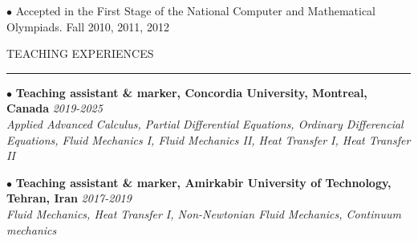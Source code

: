 \documentclass[11pt]{article}
\begin{document}
		{\noindent $\bullet$ Accepted in the First Stage of the National Computer and Mathematical Olympiads.} \hfill {Fall 2010, 2011, 2012} 
		\vspace{1.5mm}
		
		\newpage
		
		\noindent TEACHING EXPERIENCES
		
		\vspace{-2mm}
		
		\noindent\rule[0.5ex]{\linewidth}{1pt}
		
		{\noindent $\bullet$ \bf Teaching assistant \& marker, Concordia University, Montreal, Canada} \hfill {\em 2019-2025} 
		\\ \textit{Applied Advanced Calculus, Partial Differential Equations, Ordinary Differencial Equations, Fluid Mechanics I, Fluid Mechanics II, Heat Transfer I, Heat Transfer II}
		
		\vspace{1.5mm}
		
		{\noindent $\bullet$ \bf Teaching assistant \& marker, Amirkabir University of Technology, Tehran, Iran} \hfill {\em 2017-2019} 
		\\ \textit{Fluid Mechanics, Heat Transfer I, Non-Newtonian Fluid Mechanics, Continuum mechanics}
		
		
		
		
		
		
		
		
		
	
		

		

		
		
		
\end{document}
